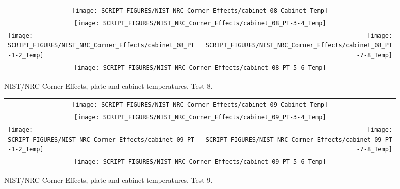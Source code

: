 \begin{figure}[p]
\begin{tabular*}{\textwidth}{l@{\extracolsep{\fill}}r}
\multicolumn{2}{c}{\texttt{[image: SCRIPT\_FIGURES/NIST\_NRC\_Corner\_Effects/cabinet\_08\_Cabinet\_Temp]}} \\
\multicolumn{2}{c}{\texttt{[image: SCRIPT\_FIGURES/NIST\_NRC\_Corner\_Effects/cabinet\_08\_PT-3-4\_Temp]}} \\
\texttt{[image: SCRIPT\_FIGURES/NIST\_NRC\_Corner\_Effects/cabinet\_08\_PT-1-2\_Temp]} &
\texttt{[image: SCRIPT\_FIGURES/NIST\_NRC\_Corner\_Effects/cabinet\_08\_PT-7-8\_Temp]} \\
\multicolumn{2}{c}{\texttt{[image: SCRIPT\_FIGURES/NIST\_NRC\_Corner\_Effects/cabinet\_08\_PT-5-6\_Temp]}}
\end{tabular*}
\caption[NIST/NRC Corner Effects, plate and cabinet temperatures, Test 8]{NIST/NRC Corner Effects, plate and cabinet temperatures, Test 8.}
\label{NIST_NRC_Cabinet_PT_Test_8}
\end{figure}

\begin{figure}[p]
\begin{tabular*}{\textwidth}{l@{\extracolsep{\fill}}r}
\multicolumn{2}{c}{\texttt{[image: SCRIPT\_FIGURES/NIST\_NRC\_Corner\_Effects/cabinet\_09\_Cabinet\_Temp]}} \\
\multicolumn{2}{c}{\texttt{[image: SCRIPT\_FIGURES/NIST\_NRC\_Corner\_Effects/cabinet\_09\_PT-3-4\_Temp]}} \\
\texttt{[image: SCRIPT\_FIGURES/NIST\_NRC\_Corner\_Effects/cabinet\_09\_PT-1-2\_Temp]} &
\texttt{[image: SCRIPT\_FIGURES/NIST\_NRC\_Corner\_Effects/cabinet\_09\_PT-7-8\_Temp]} \\
\multicolumn{2}{c}{\texttt{[image: SCRIPT\_FIGURES/NIST\_NRC\_Corner\_Effects/cabinet\_09\_PT-5-6\_Temp]}}
\end{tabular*}
\caption[NIST/NRC Corner Effects, plate and cabinet temperatures, Test 9]{NIST/NRC Corner Effects, plate and cabinet temperatures, Test 9.}
\label{NIST_NRC_Cabinet_PT_Test_9}
\end{figure}

